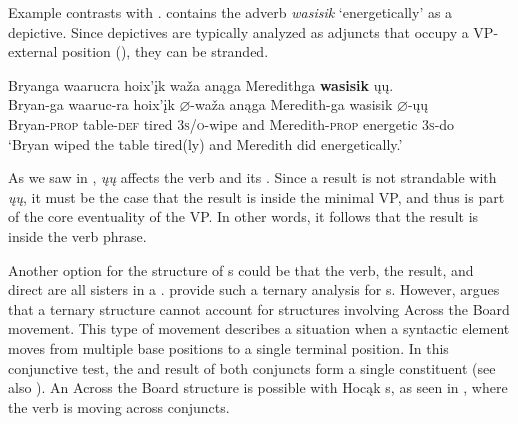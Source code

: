 \documentclass[output=paper]{LSP/langsci}
\begin{document}

\z
\z

Example  contrasts with .   contains the adverb \emph{wasisik} `energetically' as a depictive. Since depictives are typically analyzed as adjuncts that occupy a VP-external position (\citealt{LevinRappaportHovav1995}), they can be stranded.

\ea\label{ex:rosen:25} 
\glll Bryanga {\ob}{\sVP} waarucra hoix'įk waža{\cb} anąga  Meredithga \textbf{wasisik} {\ob}ųų{\cb}. \\
 Bryan-ga {} waaruc-ra hoix'įk {$\varnothing$}-waža anąga Meredith-ga  wasisik {$\varnothing$}-ųų\\
Bryan-\textsc{prop} {} table-\textsc{def} tired \textsc{3s/o}-wipe and Meredith-\textsc{prop}  energetic {\db}\textsc{3s}-do\\
\glt `Bryan wiped the table tired(ly) and Meredith did energetically.'
\z

As we saw in , \textit{ųų} affects the verb and its . Since a result  is not strandable with \textit{ųų}, it must be the case that the result is inside the minimal VP, and thus is part of the core eventuality of the VP. In other words, it follows that the result is inside the verb phrase.

 
Another option for the structure of s could be that the verb, the result, and direct  are all sisters in a .  \citet{Carrier1992} provide such a ternary analysis for  s. However, \citet{Bowers1997} argues that a ternary structure cannot account for structures involving Across the Board movement. This type of movement describes a situation when a syntactic element moves from multiple base positions to a single terminal position. In this conjunctive test, the  and result of both conjuncts form a single constituent (see also \citealt{Li1999}). An Across the Board structure is possible with Hocąk s, as seen in , where the verb is moving across conjuncts.
 
\end{document}
